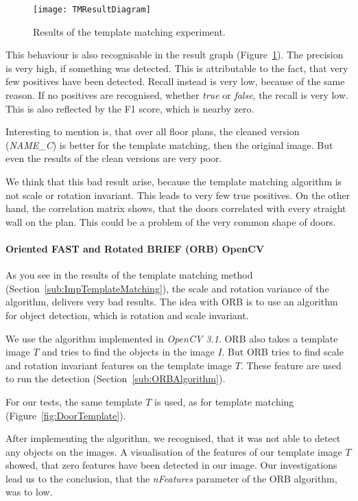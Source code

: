 \begin{figure}[H]
	\centering
	\texttt{[image: TMResultDiagram]}
	\caption{Results of the template matching experiment.}
	\label{fig:TMResultDiagram}
\end{figure}

This behaviour is also recognisable in the result graph (Figure~\ref{fig:TMResultDiagram}). The precision is very high, if something was detected. This is attributable to the fact, that very few positives have been detected. Recall instead is very low, because of the same reason. If no positives are recognised, whether \textit{true} or \textit{false}, the recall is very low. This is also reflected by the F1 score, which is nearby zero.

Interesting to mention is, that over all floor plans, the cleaned version (\textit{NAME\_C}) is better for the template matching, then the original image. But even the results of the clean versions are very poor.

We think that this bad result arise, because the template matching algorithm is not scale or rotation invariant. This leads to very few true positives. On the other hand, the correlation matrix shows, that the doors correlated with every straight wall on the plan. This could be a problem of the very common shape of doors.

\paragraph{Oriented FAST and Rotated BRIEF (ORB) OpenCV}
\label{sub:ImpORB}

As you see in the results of the template matching method (Section~\ref{sub:ImpTemplateMatching}), the scale and rotation variance of the algorithm, delivers very bad results. The idea with ORB is to use an algorithm for object detection, which is rotation and scale invariant.

We use the algorithm implemented in \textit{OpenCV 3.1}. ORB also takes a template image $T$ and tries to find the objects in the image $I$. But ORB tries to find scale and rotation invariant features on the template image $T$. These feature are used to run the detection (Section~\ref{sub:ORBAlgorithm}). 

For our tests, the same template $T$ is used, as for template matching (Figure~\ref{fig:DoorTemplate}).

After implementing the algorithm, we recognised, that it was not able to detect any objects on the images. A visualisation of the features of our template image $T$ showed, that zero features have been detected in our image. Our investigations lead us to the conclusion, that the \textit{nFeatures} parameter of the ORB algorithm, was to low.

